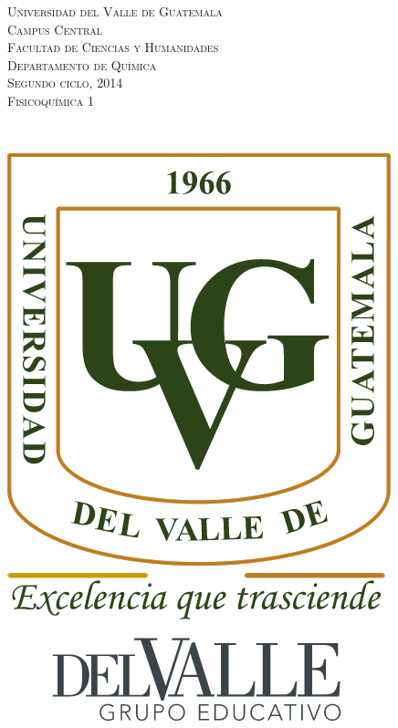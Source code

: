 \documentclass[a4paper,12pt]{article}
\begin{document}
\newcommand{\HRule}{\rule{\linewidth}{0.4mm}} %


\begin{minipage}{0.7\textwidth}
\begin{flushleft} 
\textsc{Universidad del Valle de Guatemala \\
Campus Central \\
Facultad de Ciencias y Humanidades \\
Departamento de Qu\'imica \\
Segundo ciclo, 2014 \\
Fisicoqu\'imica 1 \\
}
\end{flushleft}
\end{minipage}
~
\begin{minipage}{0.2\textwidth}
\begin{flushright}
\includegraphics[scale=0.3]{Logo_UVG} %
\end{flushright}
\end{minipage}\\
\end{document}
